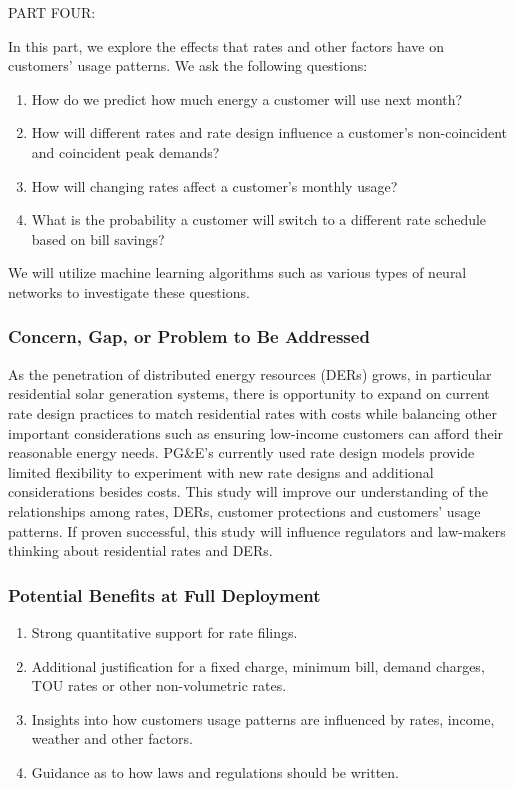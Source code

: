 \documentclass[12pt]{article}
\begin{document}
\noindent PART FOUR:

In this part, we explore the effects that rates and other factors have on customers' usage patterns. We ask the following questions:
\begin{enumerate}
	\item How do we predict how much energy a customer will use next month?
	\item How will different rates and rate design influence a customer's non-coincident and coincident peak demands?
	\item How will changing rates affect a customer's monthly usage?
	\item What is the probability a customer will switch to a different rate schedule based on bill savings?
\end{enumerate}

We will utilize machine learning algorithms such as various types of neural networks to investigate these questions.

\subsubsection*{Concern, Gap, or Problem to Be Addressed}

As the penetration of distributed energy resources (DERs) grows, in particular residential solar generation systems, there is opportunity to expand on current rate design practices to match residential rates with costs while balancing other important considerations such as ensuring low-income customers can afford their reasonable energy needs. PG\&E's currently used rate design models provide limited flexibility to experiment with new rate designs and additional considerations besides costs. This study will improve our understanding of the relationships among rates, DERs, customer protections and customers' usage patterns. If proven successful, this study will influence regulators and law-makers thinking about residential rates and DERs.

\subsubsection*{Potential Benefits at Full Deployment}
\begin{enumerate}
\item Strong quantitative support for rate filings.
\item Additional justification for a fixed charge, minimum bill, demand charges, TOU rates or other non-volumetric rates.
\item Insights into how customers usage patterns are influenced by rates, income, weather and other factors.
\item Guidance as to how laws and regulations should be written.
\end{enumerate}
\end{document}
